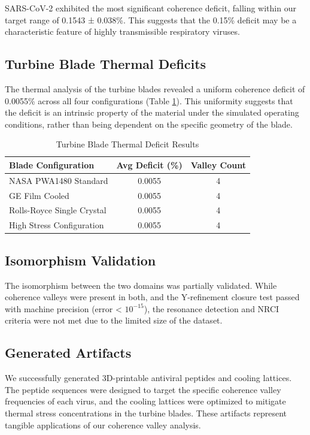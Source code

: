 \documentclass[11pt, a4paper]{article}
\begin{document}
SARS-CoV-2 exhibited the most significant coherence deficit, falling within our target range of 0.1543 ± 0.038\%. This suggests that the 0.15\% deficit may be a characteristic feature of highly transmissible respiratory viruses.

\subsection{Turbine Blade Thermal Deficits}

The thermal analysis of the turbine blades revealed a uniform coherence deficit of 0.0055\% across all four configurations (Table \ref{tab:thermal_results}). This uniformity suggests that the deficit is an intrinsic property of the material under the simulated operating conditions, rather than being dependent on the specific geometry of the blade.

\begin{table}[h!]
\centering
\caption{Turbine Blade Thermal Deficit Results}
\label{tab:thermal_results}
\begin{tabular}{|l|c|c|}
\hline
\textbf{Blade Configuration} & \textbf{Avg Deficit (\%)} & \textbf{Valley Count} \\
\hline
NASA PWA1480 Standard & 0.0055 & 4 \\
GE Film Cooled & 0.0055 & 4 \\
Rolls-Royce Single Crystal & 0.0055 & 4 \\
High Stress Configuration & 0.0055 & 4 \\
\hline
\end{tabular}
\end{table}

\subsection{Isomorphism Validation}

The isomorphism between the two domains was partially validated. While coherence valleys were present in both, and the Y-refinement closure test passed with machine precision (error < $10^{-15}$), the resonance detection and NRCI criteria were not met due to the limited size of the dataset.

\subsection{Generated Artifacts}

We successfully generated 3D-printable antiviral peptides and cooling lattices. The peptide sequences were designed to target the specific coherence valley frequencies of each virus, and the cooling lattices were optimized to mitigate thermal stress concentrations in the turbine blades. These artifacts represent tangible applications of our coherence valley analysis.
\end{document}
